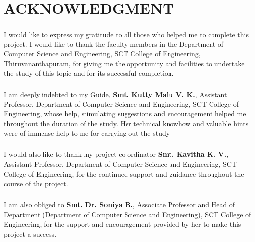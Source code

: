 \documentclass[a4paper,12pt]{report}
\begin{document}
\chapter*{\large{ACKNOWLEDGMENT}}
\paragraph{}I would like to express my gratitude to all those who helped me to complete this project. I would like to thank the faculty members in the Department of Computer Science and Engineering, SCT College of Engineering, Thiruvananthapuram, for giving me the opportunity and facilities to undertake the study of this topic and for its successful completion.
\paragraph{} I am deeply indebted to my Guide, \textbf{Smt. Kutty Malu V. K.}, Assistant Professor, Department of Computer Science and Engineering, SCT College of Engineering, whose help, stimulating suggestions and encouragement helped me throughout the duration of the study. Her technical knowhow and valuable hints were of immense help to me for carrying out the study.
\paragraph{} I would also like to thank my project co-ordinator \textbf{Smt. Kavitha K. V.}, Assistant Professor, Department of Computer Science and Engineering, SCT College of Engineering, for the continued support and guidance throughout the course of the project.
 \paragraph{} I am also obliged to \textbf{Smt. Dr. Soniya B.}, Associate Professor and Head of Department (Department of Computer Science and Engineering), SCT College of Engineering, for the support and encouragement provided by her to make this project a success.
\thispagestyle{empty}
\end{document}
